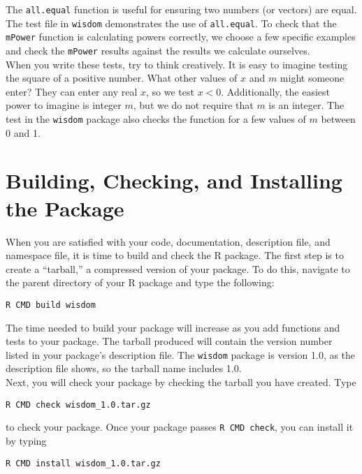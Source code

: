 \documentclass{article}
\begin{document}
 The \texttt{all.equal} function is useful for ensuring two numbers (or vectors) are equal. The test file in \texttt{wisdom} demonstrates the use of \texttt{all.equal}. To check that the \texttt{mPower} function is calculating  powers correctly, we choose a few specific examples and check the \texttt{mPower} results against the results we calculate ourselves.\\

 When you write these tests, try to think creatively. It is easy to imagine testing the square of a positive number. What other values of $x$ and $m$ might someone enter? They can enter any real $x$, so we test $x < 0$. Additionally, the easiest power to imagine is integer $m$, but we do not require that $m$ is an integer. The test in the \texttt{wisdom} package also checks  the function for a few values of $m$ between 0 and 1.\\








\section{Building, Checking, and Installing the Package}
When you are satisfied with your code, documentation, description file, and namespace file, it is time to build and check the R package. The first step is to create a ``tarball,'' a compressed version of your package. To do this, navigate to the parent directory of your R package and type the following:
\begin{verbatim}
R CMD build wisdom
\end{verbatim}
The time needed to build your package will increase as you add functions and tests to your package.  The tarball produced will contain the version number listed in your package's description file.  The \texttt{wisdom} package is version 1.0, as the description file shows, so the tarball name includes 1.0. \\

Next, you will check your package by checking the tarball you have created. Type
\begin{verbatim}
R CMD check wisdom_1.0.tar.gz 
\end{verbatim} 
to check your package. Once your package passes \texttt{R CMD check}, you can install it by typing
\begin{verbatim}
R CMD install wisdom_1.0.tar.gz 
\end{verbatim} 
\end{document}
